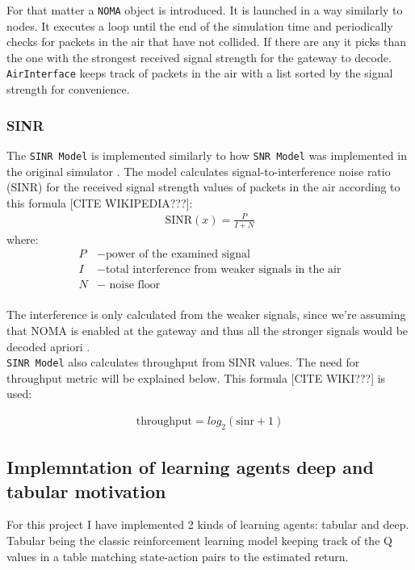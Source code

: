 For that matter a \texttt{NOMA} object is introduced. It is 
launched in a way similarly to nodes. It executes a loop
until the end of the simulation time and periodically checks
for packets in the air that have not collided. If there are any
it picks than the one with the strongest received signal 
strength for the gateway to decode. \texttt{AirInterface} keeps
track of packets in the air with a list sorted by the signal
strength for convenience. 

\subsubsection{SINR}
The \texttt{SINR Model} is implemented similarly to how \texttt{SNR Model} was implemented in the original simulator \cite{simulator}. The model calculates signal-to-interference noise ratio (SINR) for the received signal strength values of packets in the air according to this formula [CITE WIKIPEDIA???]:
\begin{align}
    \text{SINR}(x) = \frac{P}{I + N} \label{eq:sinr}
\end{align}
where:
\begin{align*}
     P &- \text{power of the examined signal}\\
     I &- \text{total interference from weaker signals in the air}\\
     N &- \text{ noise floor}\\
\end{align*}

The interference is only calculated from the weaker signals, since we're assuming that NOMA is enabled at 
the gateway and thus all the stronger signals would be
decoded apriori \cite{noma_original}.\\

\texttt{SINR Model} also calculates throughput from SINR values. The need for throughput metric will be explained below. This formula [CITE WIKI???] is used:

\begin{align}
    \text{throughput} = \text{$log_{2}$}(\text{sinr} + 1)
\end{align}



\subsection{ Implemntation of learning agents deep and tabular motivation}

For this project I have implemented 2 kinds of learning 
agents: tabular and deep. Tabular being the classic 
reinforcement learning model keeping track of the Q values
in a table matching state-action pairs to the estimated return.\\

